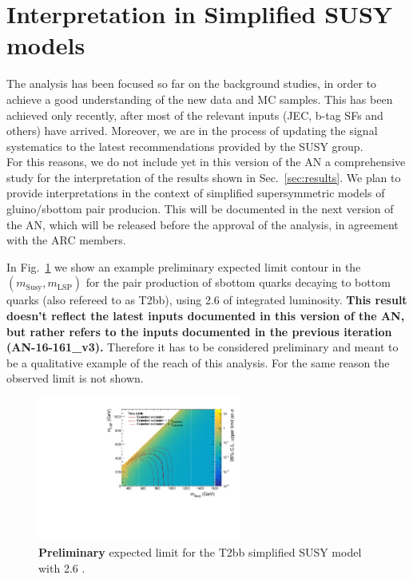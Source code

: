 \section{Interpretation in Simplified SUSY models}
\label{sec:susy}
The analysis has been focused so far on the background studies, 
in order to achieve a good understanding of the new data and MC samples. 
This has been achieved only recently, after most of the relevant inputs (JEC, b-tag SFs and others) have arrived.
Moreover, we are in the process of updating the signal systematics to the latest recommendations 
provided by the SUSY group. \\
For this reasons, we do not include yet in this version of the AN a comprehensive study for the interpretation of the results shown in Sec.~\ref{sec:results}. 
We plan to provide interpretations in the context of simplified supersymmetric models of gluino/sbottom pair producion. 
This will be documented in the next version of the AN, which will be released before the approval of the analysis, in agreement with the ARC members. 

In Fig.~\ref{fig:limits_T2bb_rubbish} we show an example preliminary expected limit contour in the $(m_{\mathrm{Susy}},m_{\mathrm{LSP}})$ 
for the pair production of sbottom quarks decaying to bottom quarks (also refereed to as T2bb), using 2.6 \ifb of integrated luminosity. 
\textbf{This result doesn't reflect the latest inputs documented in this version of the AN, 
but rather refers to the inputs documented in the previous iteration (AN-16-161\_v3). }
Therefore it has to be considered preliminary and meant to be a qualitative example of the reach of this analysis. 
For the same reason the observed limit is not shown. 


\begin{figure}[h!]
  \caption{\textbf{Preliminary} expected limit for the T2bb simplified SUSY model with 2.6 \ifb. \label{fig:limits_T2bb_rubbish}}
  \begin{center}
    \includegraphics[width=0.6\textwidth]{figures/susyResults/T2bb_rubbish}    
  \end{center}
\end{figure}



